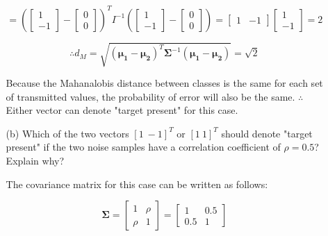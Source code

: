 \documentclass[fleqn]{article}
\begin{document}
\begin{enumerate}
\begin{enumerate}
			\begin{equation*}
				= \left(\begin{bmatrix} 1 \\ -1 \end{bmatrix} - \begin{bmatrix} 0 \\ 0 \end{bmatrix}\right)^TI^{-1}\left(\begin{bmatrix} 1 \\ -1 \end{bmatrix} - \begin{bmatrix} 0 \\ 0 \end{bmatrix}\right) = \begin{bmatrix} 1 & -1 \end{bmatrix}\begin{bmatrix} 1 \\ -1 \end{bmatrix} = 2
			\end{equation*}
			
			\begin{equation*}
				\therefore d_M = \sqrt{(\mathbf{\mu_1} - \mathbf{\mu_2})^T\mathbf{\Sigma}^{-1}(\mathbf{\mu_1} - \mathbf{\mu_2})} = \sqrt{2}
			\end{equation*}
			
			Because the Mahanalobis distance between classes is the same for each set of transmitted values, the probability of error will also be the same. $\therefore$ Either vector can denote "target present" for this case.
			
			\item[(b)] Which of the two vectors $[1 \: -1]^T$ or $[1 \: 1]^T$ should denote "target present" if the two noise samples have a correlation coefficient of $\rho = 0.5$? Explain why?
			
			The covariance matrix for this case can be written as follows:
			
			\begin{equation*}
				\mathbf{\Sigma} = \begin{bmatrix}
					1 & \rho\\
					\rho & 1
				\end{bmatrix} = \begin{bmatrix}
					1 & 0.5\\
					0.5 & 1
				\end{bmatrix}
			\end{equation*}
			

\end{enumerate}
\end{enumerate}
\end{document}
